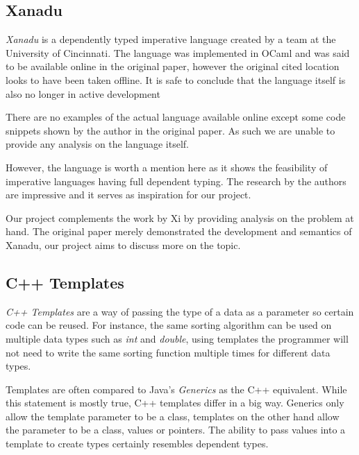 \documentclass[a4paper,12pt]{report}
\begin{document}
\subsection{Xanadu}
\textit{Xanadu} \cite{xanadu} is a dependently typed imperative language created by a team at 
the University of Cincinnati. The language was implemented in OCaml and was 
said to be available online in the original paper, however the original cited 
location looks to have been taken offline. It is safe to conclude that 
the language itself is also no longer in active development 

\par
There are no examples of the actual language available online except some code 
snippets shown by the author in the original paper. As such we are unable to 
provide any analysis on the language itself.

\par
However, the language is worth a mention here as it shows the feasibility of 
imperative languages having full dependent typing. The research by the authors 
are impressive and it serves as inspiration for our project. 

\par
Our project complements the work by Xi by providing analysis on the problem at 
hand. The original paper merely demonstrated the development and semantics of 
Xanadu, our project aims to discuss more on the topic. 

\subsection{C++ Templates}
\textit{C++ Templates} \cite{cppTemplate} are a way of passing the type of a 
data as a parameter so certain code can be reused. For instance, the same 
sorting algorithm can be used on multiple data types such as \textit{int} and 
\textit{double}, using templates the programmer will not need to write the same 
sorting function multiple times for different data types. 

\par
Templates are often compared to Java's \textit{Generics} \cite{javaGenerics} 
as the C++ equivalent. While this statement is mostly true, C++ templates 
differ in a big way. 
Generics only allow the template parameter to be a class, templates on the other 
hand allow the parameter to be a class, values or pointers. The ability to 
pass values into a template to create types certainly resembles dependent types.
\end{document}
